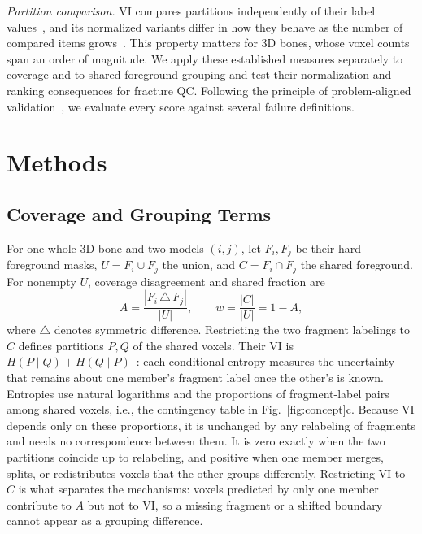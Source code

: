 \documentclass[conference]{IEEEtran}
\begin{document}
\textit{Partition comparison.} VI compares partitions independently of their label values~\cite{meila2007}, and its normalized variants differ in how they behave as the number of compared items grows~\cite{vinh2010}. This property matters for 3D bones, whose voxel counts span an order of magnitude. We apply these established measures separately to coverage and to shared-foreground grouping and test their normalization and ranking consequences for fracture QC. Following the principle of problem-aligned validation~\cite{reinke2024,maier2024}, we evaluate every score against several failure definitions.

\section{Methods}
\subsection{Coverage and Grouping Terms}
For one whole 3D bone and two models $(i,j)$, let $F_i,F_j$ be their hard foreground masks, $U=F_i\cup F_j$ the union, and $C=F_i\cap F_j$ the shared foreground. For nonempty $U$, coverage disagreement and shared fraction are
\begin{equation}
A=\frac{|F_i\,\triangle\,F_j|}{|U|},\qquad w=\frac{|C|}{|U|}=1-A ,
\end{equation}
where $\triangle$ denotes symmetric difference. Restricting the two fragment labelings to $C$ defines partitions $P,Q$ of the shared voxels. Their VI is $H(P\mid Q)+H(Q\mid P)$~\cite{meila2007}: each conditional entropy measures the uncertainty that remains about one member's fragment label once the other's is known. Entropies use natural logarithms and the proportions of fragment-label pairs among shared voxels, i.e., the contingency table in Fig.~\ref{fig:concept}c. Because VI depends only on these proportions, it is unchanged by any relabeling of fragments and needs no correspondence between them. It is zero exactly when the two partitions coincide up to relabeling, and positive when one member merges, splits, or redistributes voxels that the other groups differently. Restricting VI to $C$ is what separates the mechanisms: voxels predicted by only one member contribute to $A$ but not to VI, so a missing fragment or a shifted boundary cannot appear as a grouping difference.
\end{document}
